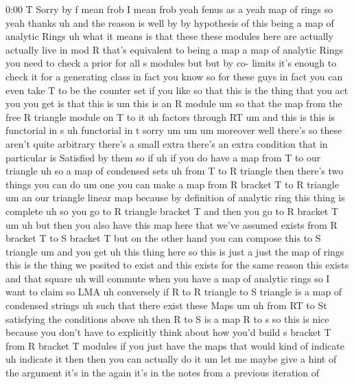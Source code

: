 \begin{unfinished}{0:00}
T  Sorry  by  f  mean  frob  I  mean  frob  yeah
fenus  as  a  yeah  map  of  rings  so
yeah  thanks  uh  and  the  reason  is  well  by
by  hypothesis  of  this  being  a  map  of
analytic  Rings  uh  what  it  means  is  that
these  these  modules  here  are  actually
actually  live  in  mod  R  that's  equivalent
to  being  a  map  a  map  of  analytic  Rings
you  need  to  check  a  prior  for  all  s
modules  but  but  by  co-  limits  it's
enough  to  check  it  for  a  generating
class  in  fact  you  know  so  for  these  guys
in  fact  you  can  even  take  T  to  be  the
counter  set  if  you  like  so  that  this  is
the  thing  that  you  act  you  you  get  is
that  this  is
um  this  is  an  R  module  um  so  that  the
map  from  the  free  R  triangle  module  on  T
to  it  uh  factors  through
RT  um  and  this  is  this  is  functorial  in
s  uh  functorial  in  t
sorry  um
um  um  moreover  well
there's  so  these  aren't  quite  arbitrary
there's  a  small  extra  there's  an  extra
condition  that  in  particular  is
Satisfied  by  them  so  if  uh  if  you  do
have  a  map  from  T  to  our  triangle  uh  so
a  map  of  condensed  sets  uh  from  T  to  R
triangle  then  there's  two  things  you  can
do
um  one  you  can  make  a  map  from  R  bracket
T  to  R
triangle  um  an  our  triangle  linear  map
because  by  definition  of  analytic  ring
this  thing  is  complete  uh  so  you  go  to  R
triangle  bracket  T  and  then  you  go  to  R
bracket
T  um  uh  but  then  you  also  have  this  map
here  that  we've  assumed  exists  from  R
bracket  T  to  S  bracket
T  but  on  the  other  hand  you  can  compose
this  to  S  triangle  um  and  you
get  uh  this  thing  here  so  this  is  just  a
just  the  map  of  rings  this  is  the  thing
we  posited  to  exist  and  this  exists  for
the  same  reason  this  exists  and  that
square  uh  will  commute  when  you  have  a
map  of  analytic
rings
so  I  want  to  claim  so
LMA  uh
conversely  if  R  to  R  triangle  to  S
triangle  is  a  map  of  condensed
strings  uh  such  that  there
exist  these  Maps
um  uh  from
RT  to
St  satisfying  the  conditions
above  uh  then  R  to  S  is  a
map  R  to
s
so  this  is  nice  because  you  don't  have
to  explicitly  think  about  how  you'd
build  s  bracket  T  from  R  bracket  T
modules  if  you  just  have  the  maps  that
would  kind  of
indicate  uh  indicate  it  then  then  you
can  actually  do
it  um  let  me  maybe  give  a  hint  of  the
argument  it's  in  the  again  it's  in  the
notes  from  a  previous  iteration  of

\end{unfinished}
